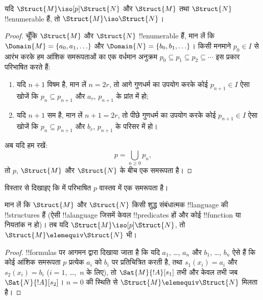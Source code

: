 \documentclass[../../../include/open-logic-section]{subfiles}
\begin{document}
\begin{thm}
  यदि $\Struct{M} \iso[p] \Struct{N}$ और $\Struct{M}$ तथा $\Struct{N}$
  !!{enumerable} हैं, तो $\Struct{M} \iso
  \Struct{N}$।
\end{thm}

\begin{proof}
  चूँकि $\Struct{M}$ और $\Struct{N}$ !!{enumerable} हैं, मान लें कि
  $\Domain{M} =
  \{a_0, a_1, \ldots \}$ और $\Domain{N} = \{b_0, b_1, \ldots \}$। किसी
  मनमाने $p_0 \in I$ से आरंभ करके हम आंशिक समरूपताओं का एक वर्धमान अनुक्रम
  $p_0 \subseteq p_1 \subseteq p_2
  \subseteq \cdots$
  इस प्रकार परिभाषित करते हैं:
  \begin{enumerate}
  \item यदि $n+1$ विषम है, मान लें $n = 2r$, तो आगे गुणधर्म का उपयोग करके
    कोई $p_{n+1} \in I$ ऐसा खोजें कि $p_n \subseteq p_{n+1}$ और $a_r$,
    $p_{n+1}$ के प्रांत में हो;
  \item यदि $n+1$ सम है, मान लें $n+1 =2r$, तो पीछे गुणधर्म का उपयोग करके
    कोई $p_{n+1} \in I$ ऐसा खोजें कि $p_n \subseteq p_{n+1}$ और $b_r$,
    $p_{n+1}$ के परिसर में हो।
  \end{enumerate}
अब यदि हम रखें:
\[
p = \bigcup_{n\ge 0} p_n,
\]
तो $p$, $\Struct{M}$ और $\Struct{N}$ के बीच एक समरूपता है।
\end{proof}

\begin{prob}
  विस्तार से दिखाइए कि  में परिभाषित
  $p$ वास्तव में एक समरूपता है।
\end{prob}

\begin{thm}
  मान लें कि $\Struct{M}$ और $\Struct{N}$ किसी शुद्ध संबंधात्मक
  !!{language} की !!{structure}s हैं (ऐसी !!a{language} जिसमें केवल
  !!{predicate}s हों और कोई !!{function} या नियतांक न हो)। तब यदि
  $\Struct{M} \iso[p] \Struct{N}$, तो $\Struct{M} \elemequiv
  \Struct{N}$ भी।
\end{thm}

\begin{proof}
  !!{formula}s पर आगमन द्वारा दिखाया जाता है कि यदि $a_1$, \dots, $a_n$
  और $b_1$, \dots, $b_n$ ऐसे हैं कि कोई आंशिक समरूपता $p$ प्रत्येक $a_i$
  को $b_i$ पर प्रतिचित्रित करती है, तथा $s_1(x_i) =a_i$ और $s_2(x_i) =b_i$
  ($i =1$, \dots,~$n$ के लिए), तो $\Sat{M}{!A}[s_1]$ तभी और केवल तभी जब
  $\Sat{N}{!A}[s_2]$। $n=0$ की स्थिति से
  $\Struct{M} \elemequiv \Struct{N}$ मिलता है।
\end{proof}
\end{document}
